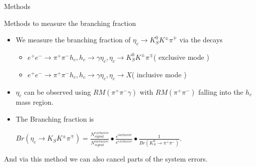 \documentclass{beamer}
\begin{document}
\begin{frame}{Methods}
    \begin{block}{Methods to measure the branching fraction}
        \begin{itemize}
            \bigskip
            \item We measure the branching fraction of $\eta_c\to K_S^0 K^{\pm}\pi^{\mp}$ via the decays
                \begin{itemize}
                    \item $e^+e^-\to \pi^+ \pi^- h_c, h_c\to \gamma\eta_c, \eta_c\to K_S^0 K^{\pm}\pi^{\mp}$( exclusive mode )
                    \item $e^+e^-\to \pi^+ \pi^- h_c, h_c\to \gamma\eta_c, \eta_c\to X$( inclusive mode )
                \end{itemize}
            \bigskip
            \item $\eta_c$ can be observed using $RM( \pi^+ \pi^- \gamma )$ with $RM(\pi^+\pi^-)$ falling into the $h_c$ mass region.
            \bigskip
            \item The Branching fraction is\\
                \begin{center}
                    $Br(\eta_c\to K_S K^{\pm}\pi^{\mp}) = \frac{N^{exclusive}_{signal}}{N^{inclusive}_{signal}}\bullet\frac{\epsilon^{inclusive}}{\epsilon^{exclusive}}\bullet\frac{1}{Br(K^0_S\to\pi^+\pi^{-})}$.
                \end{center}
        \end{itemize}
    \end{block}
    \begin{block}{}
        And via this method we can also cancel parts of the system errors.
    \end{block}
\end{frame}
\end{document}
